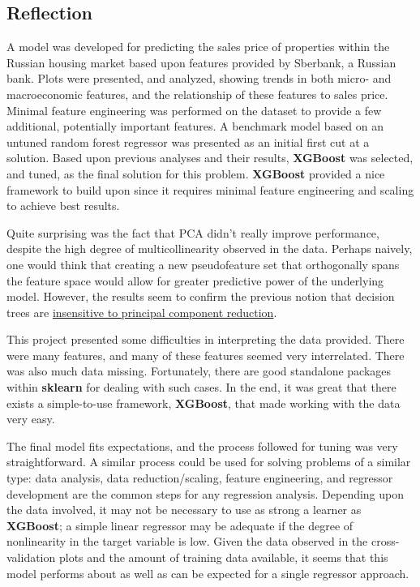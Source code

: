 \documentclass[12pt]{article}
\theoremstyle{plain} %
\theoremstyle{definition} %
\theoremstyle{remark} %
\begin{document}
\subsection*{Reflection}
\indent \par A model was developed for predicting the sales price of properties within the Russian housing market based upon features provided by Sberbank, a Russian bank.  Plots were presented, and analyzed, showing trends in both micro- and macroeconomic features, and the relationship of these features to sales price.  Minimal feature engineering was performed on the dataset to provide a few additional, potentially important features.  A benchmark model based on an untuned random forest regressor was presented as an initial first cut at a solution.  Based upon previous analyses and their results, \textbf{XGBoost} was selected, and tuned, as the final solution for this problem.  \textbf{XGBoost} provided a nice framework to build upon since it requires minimal feature engineering and scaling to achieve best results.

Quite surprising was the fact that PCA didn't really improve performance, despite the high degree of multicollinearity observed in the data.  Perhaps naively, one would think that creating a new pseudofeature set that orthogonally spans the feature space would allow for greater predictive power of the underlying model.  However, the results seem to confirm the previous notion that decision trees are \href{https://stats.stackexchange.com/questions/141864/how-can-top-principal-components-retain-the-predictive-power-on-a-dependent-vari}{insensitive to principal component reduction}.

This project presented some difficulties in interpreting the data provided.  There were many features, and many of these features seemed very interrelated.  There was also much data missing.  Fortunately, there are good standalone packages within \textbf{sklearn} for dealing with such cases.  In the end, it was great that there exists a simple-to-use framework, \textbf{XGBoost}, that made working with the data very easy.

The final model fits expectations, and the process followed for tuning was very straightforward.  A similar process could be used for solving problems of a similar type: data analysis, data reduction/scaling, feature engineering, and regressor development are the common steps for any regression analysis.  Depending upon the data involved, it may not be necessary to use as strong a learner as \textbf{XGBoost}; a simple linear regressor may be adequate if the degree of nonlinearity in the target variable is low.  Given the data observed in the cross-validation plots and the amount of training data available, it seems that this model performs about as well as can be expected for a single regressor approach.
\end{document}
